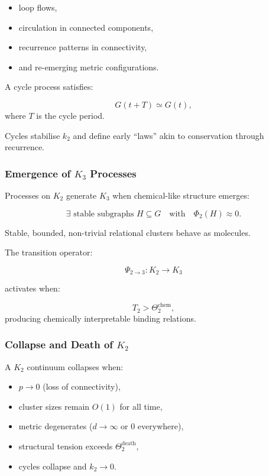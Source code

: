 \begin{itemize}
    \item loop flows,
    \item circulation in connected components,
    \item recurrence patterns in connectivity,
    \item and re-emerging metric configurations.
\end{itemize}

A cycle process satisfies:

\[
G(t + T) \simeq G(t),
\]
where $T$ is the cycle period.

Cycles stabilise $k_2$ and define early “laws” akin to conservation
through recurrence.

\subsubsection{Emergence of \texorpdfstring{$K_3$}{K_3} Processes}

Processes on $K_2$ generate $K_3$ when chemical-like structure emerges:

\[
\exists \text{ stable subgraphs } H \subseteq G
\quad
\text{with}
\quad
\Phi_2(H) \approx 0.
\]

Stable, bounded, non-trivial relational clusters behave as molecules.

The transition operator:

\[
\Psi_{2\to3}: K_2 \to K_3
\]

activates when:

\[
T_2 > \Theta_2^{\text{chem}},
\]
producing chemically interpretable binding relations.

\subsubsection{Collapse and Death of \texorpdfstring{$K_2$}{K_2}}

A $K_2$ continuum collapses when:

\begin{itemize}
    \item $p \to 0$ (loss of connectivity),
    \item cluster sizes remain $O(1)$ for all time,
    \item metric degenerates ($d \to \infty$ or $0$ everywhere),
    \item structural tension exceeds $\Theta_2^{\text{death}}$,
    \item cycles collapse and $k_2 \to 0$.
\end{itemize}

